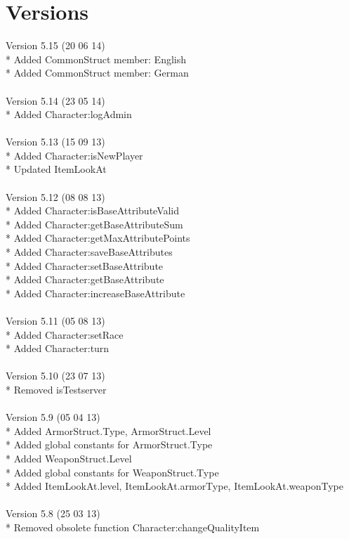\documentclass[a4paper,10pt,makeidx]{scrreprt}
\begin{document}
\chapter{Versions}
Version 5.15 (20 06 14)\\
* Added CommonStruct member: English\\
* Added CommonStruct member: German\\
\\
Version 5.14 (23 05 14)\\
* Added Character:logAdmin\\
\\
Version 5.13 (15 09 13)\\
* Added Character:isNewPlayer\\
* Updated ItemLookAt\\
\\
Version 5.12 (08 08 13)\\
* Added Character:isBaseAttributeValid\\
* Added Character:getBaseAttributeSum\\
* Added Character:getMaxAttributePoints\\
* Added Character:saveBaseAttributes\\
* Added Character:setBaseAttribute\\
* Added Character:getBaseAttribute\\
* Added Character:increaseBaseAttribute\\
\\
Version 5.11 (05 08 13)\\
* Added Character:setRace\\
* Added Character:turn\\
\\
Version 5.10 (23 07 13)\\
* Removed isTestserver\\
\\
Version 5.9 (05 04 13)\\
* Added ArmorStruct.Type, ArmorStruct.Level\\
* Added global constants for ArmorStruct.Type\\
* Added WeaponStruct.Level\\
* Added global constants for WeaponStruct.Type\\
* Added ItemLookAt.level, ItemLookAt.armorType, ItemLookAt.weaponType\\
\\
Version 5.8 (25 03 13)\\
* Removed obsolete function Character:changeQualityItem\\
\end{document}
